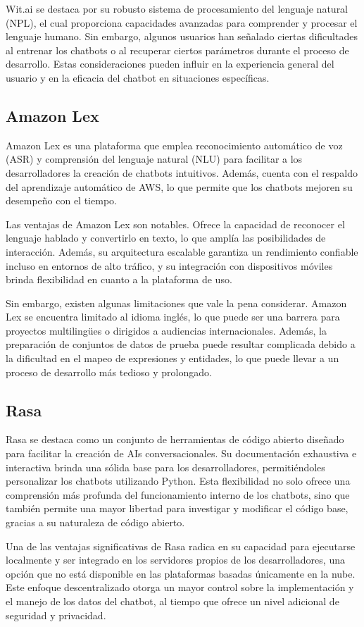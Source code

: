 Wit.ai se destaca por su robusto sistema de procesamiento del lenguaje natural (NPL), el cual proporciona capacidades avanzadas para comprender y procesar el lenguaje humano. Sin embargo, algunos usuarios han señalado ciertas dificultades al entrenar los chatbots o al recuperar ciertos parámetros durante el proceso de desarrollo. Estas consideraciones pueden influir en la experiencia general del usuario y en la eficacia del chatbot en situaciones específicas.
\subsection{Amazon Lex}
Amazon Lex es una plataforma que emplea reconocimiento automático de voz (ASR) y comprensión del lenguaje natural (NLU) para facilitar a los desarrolladores la creación de chatbots intuitivos. Además, cuenta con el respaldo del aprendizaje automático de AWS, lo que permite que los chatbots mejoren su desempeño con el tiempo.

Las ventajas de Amazon Lex son notables. Ofrece la capacidad de reconocer el lenguaje hablado y convertirlo en texto, lo que amplía las posibilidades de interacción. Además, su arquitectura escalable garantiza un rendimiento confiable incluso en entornos de alto tráfico, y su integración con dispositivos móviles brinda flexibilidad en cuanto a la plataforma de uso.

Sin embargo, existen algunas limitaciones que vale la pena considerar. Amazon Lex se encuentra limitado al idioma inglés, lo que puede ser una barrera para proyectos multilingües o dirigidos a audiencias internacionales. Además, la preparación de conjuntos de datos de prueba puede resultar complicada debido a la dificultad en el mapeo de expresiones y entidades, lo que puede llevar a un proceso de desarrollo más tedioso y prolongado.
\subsection{Rasa}
Rasa se destaca como un conjunto de herramientas de código abierto diseñado para facilitar la creación de AIs conversacionales. Su documentación exhaustiva e interactiva brinda una sólida base para los desarrolladores, permitiéndoles personalizar los chatbots utilizando Python. Esta flexibilidad no solo ofrece una comprensión más profunda del funcionamiento interno de los chatbots, sino que también permite una mayor libertad para investigar y modificar el código base, gracias a su naturaleza de código abierto.

Una de las ventajas significativas de Rasa radica en su capacidad para ejecutarse localmente y ser integrado en los servidores propios de los desarrolladores, una opción que no está disponible en las plataformas basadas únicamente en la nube. Este enfoque descentralizado otorga un mayor control sobre la implementación y el manejo de los datos del chatbot, al tiempo que ofrece un nivel adicional de seguridad y privacidad.

